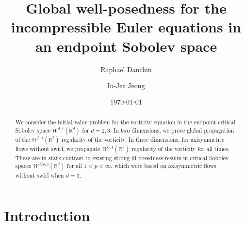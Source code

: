 \documentclass[11pt]{amsart}
\numberwithin{equation}{section}
\begin{document}
	
	
	\title[Euler equations in endpoint Sobolev space]{Global well-posedness for the incompressible Euler equations in an endpoint Sobolev space}
	 
	\date{\today}
	
	  \begin{NoHyper}
	\renewcommand{\thefootnote}{\fnsymbol{footnote}}
	\renewcommand{\thefootnote}{\arabic{footnote}}
	  \end{NoHyper}

\author{Rapha\"el Danchin}
\address{$^*$Univ Paris Est Creteil, Univ Gustave Eiffel, CNRS, LAMA UMR8050, F-94010 Creteil, France.}

\author{In-Jee Jeong}
\address{School of Mathematics, Korea Institute for Advanced Study, 85 Hoegi-ro, Seoul 02445, Republic of Korea.}

\begin{abstract} 
	We consider the initial value problem for the vorticity equation in the endpoint critical Sobolev space $W^{d,1}(\mathbb{R}^{d})$ for $d = 2, 3$. In two dimensions, we prove global propagation of the $W^{2,1}(\mathbb{R}^{2})$ regularity of the vorticity. In three dimensions, for axisymmetric flows without swirl, we propagate $W^{3,1}(\mathbb{R}^{3})$ regularity of the vorticity for all times. These are in stark contrast to existing strong ill-posedness results in critical Sobolev spaces $W^{d/p,p}(\mathbb{R}^{d})$ for all $1 < p < \infty$, which were based on axisymmetric flows without swirl when $d = 3$.  
\end{abstract}

\maketitle 

\section{Introduction}
\end{document}
